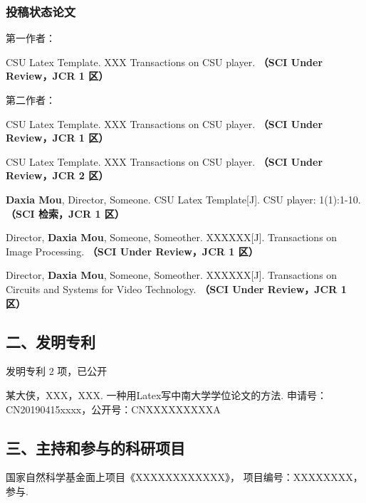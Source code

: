 \subsubsection*{投稿状态论文}
第一作者：
\begin{enumerate}[label={[\arabic*]},itemindent=2em,wide]
	\item CSU Latex Template. XXX Transactions on CSU player. {\bfseries \heiti（SCI Under Review，JCR 1 区）}
\end{enumerate}
第二作者：
\begin{enumerate}[label={[\arabic*]},itemindent=2em,wide]
	\item CSU Latex Template. XXX Transactions on CSU player. {\bfseries \heiti（SCI Under Review，JCR 1 区）}
	\item CSU Latex Template. XXX Transactions on CSU player. {\bfseries \heiti（SCI Under Review，JCR 2 区）}
\end{enumerate}


\else
\begin{enumerate}[label={[\arabic*]},itemindent=2em,wide]
	\item \textbf{Daxia Mou}, Director, Someone. CSU Latex Template[J]. CSU player: 1(1):1-10. {\bfseries \heiti（SCI 检索，JCR 1 区）}
	\item Director, \textbf{Daxia Mou}, Someone, Someother. XXXXXX[J]. Transactions on Image Processing. {\bfseries \heiti（SCI Under Review，JCR 1 区）}
	\item Director, \textbf{Daxia Mou}, Someone, Someother. XXXXXX[J]. Transactions on Circuits and Systems for Video Technology. {\bfseries \heiti（SCI Under Review，JCR 1 区）}
\end{enumerate}
\fi

\vspace{22pt}
\subsection*{二、发明专利}
\ifblindreview
发明专利 2 项，已公开
\else
\begin{enumerate}[label={[\arabic*]},itemindent=2em,wide]
	\item 某大侠，XXX，XXX. 一种用Latex写中南大学学位论文的方法. 申请号：CN20190415xxxx，公开号：CNXXXXXXXXXA
\end{enumerate}
\fi

\ifblindreview
\else

\vspace{22pt}
\subsection*{三、主持和参与的科研项目}
\begin{enumerate}[label={[\arabic*]},itemindent=2em,wide]
	\item 国家自然科学基金面上项目《XXXXXXXXXXXX》， 项目编号：XXXXXXXX，参与.
\end{enumerate}

